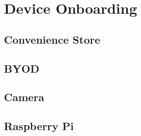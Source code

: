 \chapter{Device Onboarding}

\section{Convenience Store}

\section{BYOD}

\section{Camera}

\section{Raspberry Pi}